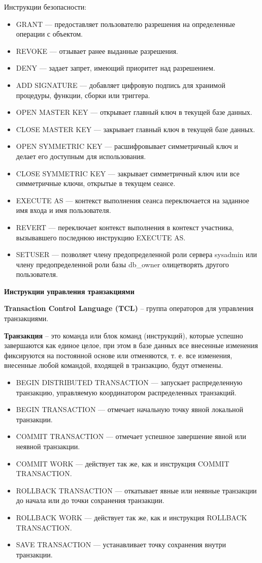 Инструкции безопасности:
\begin{itemize}
	\item GRANT — предоставляет пользователю разрешения на определенные операции с объектом.
	\item REVOKE — отзывает ранее выданные разрешения.
	\item DENY — задает запрет, имеющий приоритет над разрешением.
	\item ADD SIGNATURE — добавляет цифровую подпись для хранимой процедуры, функции, сборки или
	триггера.
	\item OPEN MASTER KEY — открывает главный ключ в текущей базе данных.
	\item CLOSE MASTER KEY — закрывает главный ключ в текущей базе данных.
	\item OPEN SYMMETRIC KEY — расшифровывает симметричный ключ и делает его доступным для использования.
	\item CLOSE SYMMETRIC KEY — закрывает симметричный ключ или все симметричные ключи, открытые
	в текущем сеансе.
	\item EXECUTE AS — контекст выполнения сеанса переключается на заданное имя входа и имя пользователя.
	\item REVERT — переключает контекст выполнения в контекст участника, вызывавшего последнюю инструкцию EXECUTE AS.
	\item SETUSER — позволяет члену предопределенной роли сервера sysadmin или члену предопределенной роли базы db\_owner олицетворять
	другого пользователя.
\end{itemize}

\textbf{Инструкции управления транзакциями}

\textbf{Transaction Control Language (TCL)} – группа операторов для управления транзакциями.

\textbf{Транзакция} – это команда или блок команд (инструкций), которые успешно завершаются как единое целое, при этом в базе данных все внесенные изменения фиксируются на постоянной основе или отменяются, т. е. все изменения, внесенные любой командой, входящей в транзакцию, будут отменены.
\begin{itemize}
	\item BEGIN DISTRIBUTED TRANSACTION — запускает распределенную транзакцию, управляемую координатором распределенных транзакций.
	\item BEGIN TRANSACTION — отмечает начальную точку явной локальной транзакции.
	\item COMMIT TRANSACTION — отмечает успешное завершение явной или неявной транзакции.
	\item COMMIT WORK — действует так же, как и инструкция COMMIT TRANSACTION.
	\item ROLLBACK TRANSACTION — откатывает явные или неявные транзакции до начала или до точки
	сохранения транзакции.
	\item ROLLBACK WORK — действует так же, как и инструкция ROLLBACK TRANSACTION.
	\item SAVE TRANSACTION — устанавливает точку сохранения внутри транзакции.
\end{itemize}

